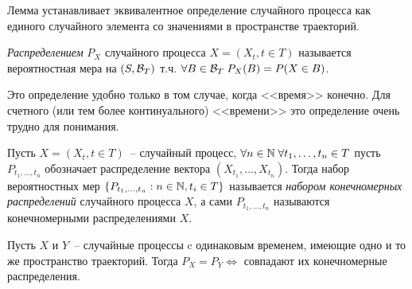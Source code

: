 \begin{remark}
Лемма устанавливает эквивалентное определение случайного процесса как единого случайного
элемента со значениями в пространстве траекторий.
\end{remark}

\begin{definition}
\emph{Распределением} $P_X$ случайного процесса $X =  (X_t, t \in T)$
называется вероятностная мера на $(S, \mathcal{B}_T)$
т.ч. $\forall B \in \mathcal{B}_T \; P_X(B) =  P(X \in B)$.
\end{definition}

Это определение удобно только в том случае, когда <<время>> конечно.
Для счетного (или тем более континуального) <<времени>> это определение
очень трудно для понимания.

\begin{definition}
Пусть $X = (X_t, t \in T)$~--  случайный процесс, $\forall n \in \mathbb{N} \;
\forall t_1, \dots, t_n \in T$
пусть $P_{t_1, \dots, t_n}$ обозначает распределение вектора $(X_{t_1}, \dots, X_{t_n})$.
Тогда набор вероятностных мер $\{P_{t_1, \dots, t_n}: n \in \mathbb{N}, t_i \in T\}$
называется \emph{набором конечномерных распределений} случайного процесса $X$, а сами
$P_{t_1, \dots, t_n}$ называются конечномерными распределениями $X$.
\end{definition}


\begin{lem}
Пусть $X$ и $Y$~-- случайные процессы c одинаковым временем, имеющие одно и то же пространство
траекторий. Тогда $P_X = P_Y \Leftrightarrow$ совпадают их конечномерные распределения.
\end{lem}


